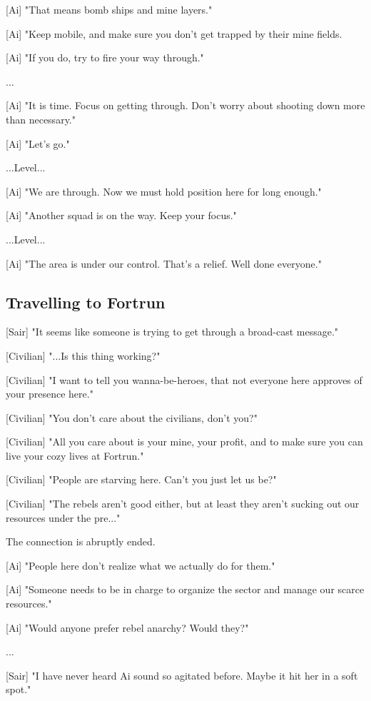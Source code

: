 \documentclass[a4paper,12pt]{article}
\begin{document}
[Ai] "That means bomb ships and mine layers." 

[Ai] "Keep mobile, and make sure you don't get trapped by their mine fields. 

[Ai] "If you do, try to fire your way through."

...

[Ai] "It is time. Focus on getting through. Don't worry about shooting
down more than necessary." 

[Ai] "Let's go."

...Level...

[Ai] "We are through. Now we must hold position here for long enough."

[Ai] "Another squad is on the way. Keep your focus."

...Level...

[Ai] "The area is under our control. That's a relief. Well done everyone."

\subsection{Travelling to Fortrun}

[Sair] "It seems like someone is trying to get through a broad-cast message."

[Civilian] "...Is this thing working?" 

[Civilian] "I want to tell you wanna-be-heroes, that not everyone here
approves of your presence here." 

[Civilian] "You don't care about the civilians, don't you?" 

[Civilian] "All you care about is your mine, your profit, and to make sure you can live your cozy lives at Fortrun."

[Civilian] "People are starving here. Can't you just let us be?"

[Civilian] "The rebels aren't good either, but at least they aren't sucking out our resources under the pre..." 

The connection is abruptly ended.

[Ai] "People here don't realize what we actually do for them."

[Ai] "Someone needs to be in charge to organize the sector and manage our scarce resources."

[Ai] "Would anyone prefer rebel anarchy? Would they?"

...

[Sair] "I have never heard Ai sound so agitated before. Maybe it hit her in a soft spot."
\end{document}
